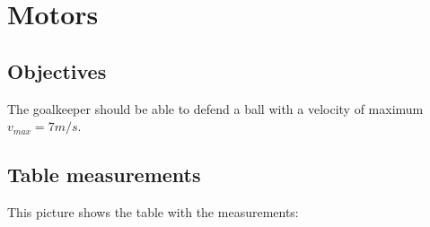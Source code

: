 \section{Motors}\label{sec:motors}

\subsection{Objectives}\label{subsec:objectives}
The goalkeeper should be able to defend a ball with a velocity of maximum $v_{max}=7m/s$.

\subsection{Table measurements}\label{subsec:table_measurements}
This picture shows the table with the measurements:

